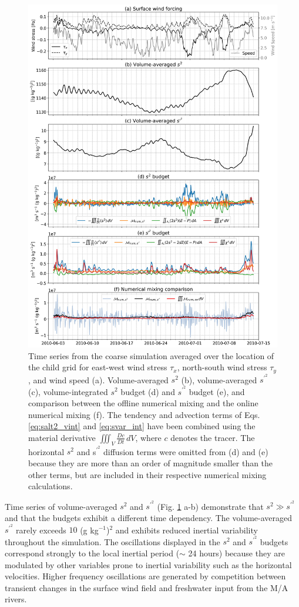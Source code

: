\begin{figure}
 \centerline{\includegraphics[width = 0.85\linewidth]{figures/james_2023/Figure7_budgets.jpg}}
  \caption{Time series from the coarse simulation averaged over the location of the child grid for east-west wind stress $\tau_x$, north-south wind stress $\tau_y$, and wind speed (a). Volume-averaged $s^2$ (b), volume-averaged $s^{\prime^2}$ (c), volume-integrated $s^2$ budget (d) and $s^{\prime^2}$ budget (e), and comparison between the offline numerical mixing and the online numerical mixing (f). The tendency and advection terms of Eqs. \ref{eq:salt2_vint} and \ref{eq:svar_int} have been combined using the material derivative $\iiint_V \frac{Dc}{Dt} \, dV$, where $c$ denotes the tracer. The horizontal $s^2$ and s$^{\prime^2}$ diffusion terms were omitted from (d) and (e) because they are more than an order of magnitude smaller than the other terms, but are included in their respective numerical mixing calculations.}
  \label{fig:budget_comparison}
\end{figure}

Time series of volume-averaged $s^2$ and $s^{\prime^2}$ (Fig. \ref{fig:budget_comparison} a-b) demonstrate that $s^2\gg s^{\prime^2}$ and that the budgets exhibit a different time dependency. The volume-averaged $s^{\prime^2}$ rarely exceeds $10$ (g kg$^{-1}$)$^2$ and exhibits reduced inertial variability throughout the simulation. The oscillations displayed in the $s^2$ and $s^{\prime^2}$ budgets correspond strongly to the local inertial period ($\sim$ 24 hours) because they are modulated by other variables prone to inertial variability such as the horizontal velocities. Higher frequency oscillations are generated by competition between transient changes in the surface wind field and freshwater input from the M/A rivers. 

